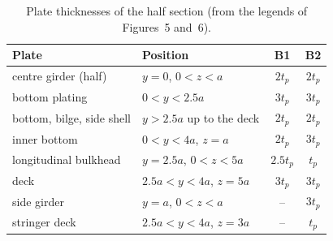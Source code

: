 \begin{table}[H]
  \centering\small
  \caption{Plate thicknesses of the half section (from the legends of Figures~5 and~6).}
  \label{tab:B1B2}
  \begin{tabular}{llcc}
    \toprule
    Plate & Position & B1 & B2 \\
    \midrule
    centre girder (half)      & $y=0$, $0<z<a$          & $2t_p$   & $2t_p$ \\
    bottom plating            & $0<y<2.5a$              & $3t_p$   & $3t_p$ \\
    bottom, bilge, side shell & $y>2.5a$ up to the deck & $2t_p$   & $2t_p$ \\
    inner bottom              & $0<y<4a$, $z=a$         & $2t_p$   & $3t_p$ \\
    longitudinal bulkhead     & $y=2.5a$, $0<z<5a$      & $2.5t_p$ & $t_p$  \\
    deck                      & $2.5a<y<4a$, $z=5a$     & $3t_p$   & $3t_p$ \\
    side girder               & $y=a$, $0<z<a$          & --       & $3t_p$ \\
    stringer deck             & $2.5a<y<4a$, $z=3a$     & --       & $t_p$  \\
    \bottomrule
  \end{tabular}
\end{table}

